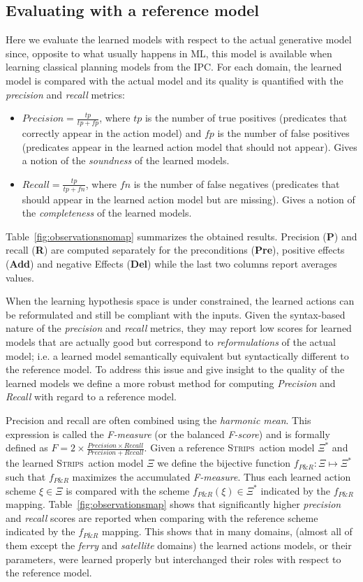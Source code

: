\documentclass{article}
\newcommand{\strips}{\textsc{Strips}}     %
\begin{document}
\subsection{Evaluating with a reference model}
Here we evaluate the learned models with respect to the actual generative model since, opposite to what usually happens in ML, this model is available when learning classical planning models from the IPC. For each domain, the learned model is compared with the actual model and its quality is quantified with the {\em precision} and {\em recall} metrics:
\begin{itemize}
\item $Precision=\frac{tp}{tp+fp}$, where $tp$ is the number of true positives (predicates that correctly appear in the action model) and $fp$ is the number of false positives (predicates appear in the learned action model that should not appear). Gives a notion of the {\em soundness} of the learned models.
\item $Recall=\frac{tp}{tp+fn}$, where $fn$ is the number of false negatives (predicates that should appear in the learned action model but are missing). Gives a notion of the {\em completeness} of the learned models.
\end{itemize}

Table~\ref{fig:observationsnomap} summarizes the obtained results. Precision ({\bf P}) and recall ({\bf R}) are computed separately for the preconditions ({\bf Pre}), positive effects ({\bf Add}) and negative Effects ({\bf Del}) while the last two columns report averages values.

When the learning hypothesis space is under constrained, the learned actions can be reformulated and still be compliant with the inputs. Given the syntax-based nature of the {\em precision} and {\em recall} metrics, they may report low scores for learned models that are actually good but correspond to {\em reformulations} of the actual model; i.e. a learned model semantically equivalent but syntactically different to the reference model. To address this issue and give insight to the quality of the learned models we define a more robust method for computing {\em Precision} and {\em Recall} with regard to a reference model.

Precision and recall are often combined using the {\em harmonic mean}. This expression is called the {\em F-measure} (or the balanced {\em F-score}) and is formally defined as $F=2\times\frac{Precision\times Recall}{Precision+Recall}$. Given a reference \strips\ action model $\Xi^*$ and the learned \strips\ action model $\Xi$ we define the bijective function $f_{P\&R}:\Xi \mapsto \Xi^*$ such that $f_{P\&R}$ maximizes the accumulated {\em F-measure}. Thus each learned action scheme $\xi\in\Xi$ is compared with the scheme $f_{P\&R}(\xi)\in \Xi^*$ indicated by the $f_{P\&R}$ mapping. Table~\ref{fig:observationsmap} shows that significantly higher {\em precision} and {\em recall} scores are reported when comparing with the reference scheme indicated by the $f_{P\&R}$ mapping. This shows that in many domains, (almost all of them except the {\em ferry} and {\em satellite} domains) the learned actions models, or their parameters, were learned properly but interchanged their roles with respect to the reference model. 
\end{document}
